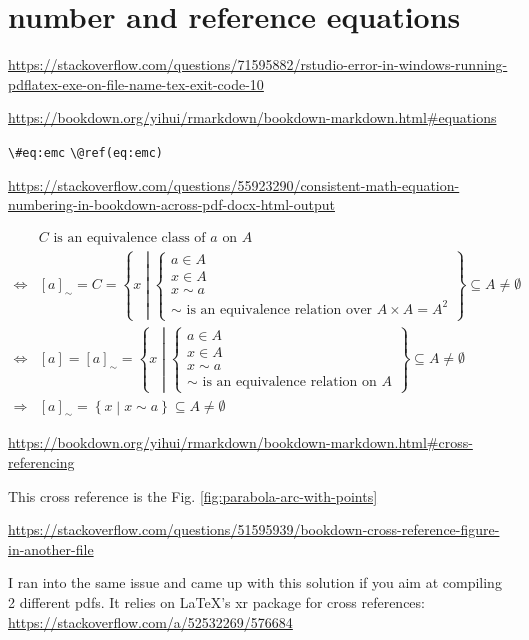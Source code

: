 \documentclass[
]{book}
\theoremstyle{definition}
\theoremstyle{definition}
\theoremstyle{definition}
\theoremstyle{definition}
\theoremstyle{remark}
\begin{document}
\section{number and reference equations}\label{nice-label}

\url{https://stackoverflow.com/questions/71595882/rstudio-error-in-windows-running-pdflatex-exe-on-file-name-tex-exit-code-10}

\url{https://bookdown.org/yihui/rmarkdown/bookdown-markdown.html\#equations}

\texttt{\textbackslash{}\#eq:emc}
\texttt{\textbackslash{}@ref(eq:emc)}

\url{https://stackoverflow.com/questions/55923290/consistent-math-equation-numbering-in-bookdown-across-pdf-docx-html-output}

\begin{equation}
\begin{aligned}
 & C\text{ is an equivalence class of }a\text{ on }A\\
\Leftrightarrow & \left[a\right]_{\sim}=C=\left\{ x\middle|\begin{cases}
a\in A\\
x\in A\\
x\sim a\\
\sim\text{ is an equivalence relation over }A\times A=A^{2}
\end{cases}\right\} \subseteq A\ne\emptyset\\
\Leftrightarrow & \left[a\right]=\left[a\right]_{\sim}=\left\{ x\middle|\begin{cases}
a\in A\\
x\in A\\
x\sim a\\
\sim\text{ is an equivalence relation on }A
\end{cases}\right\} \subseteq A\ne\emptyset\\
\Rightarrow & \left[a\right]_{\sim}=\left\{ x\middle|x\sim a\right\} \subseteq A\ne\emptyset
\end{aligned}
\label{eq:eqclass}
\end{equation}

\url{https://bookdown.org/yihui/rmarkdown/bookdown-markdown.html\#cross-referencing}

This cross reference is the Fig. \ref{fig:parabola-arc-with-points}

\url{https://stackoverflow.com/questions/51595939/bookdown-cross-reference-figure-in-another-file}

I ran into the same issue and came up with this solution if you aim at compiling 2 different pdfs. It relies on LaTeX's xr package for cross references: \url{https://stackoverflow.com/a/52532269/576684}
\end{document}
